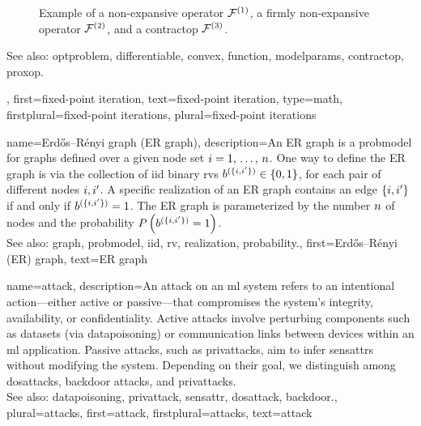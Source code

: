 {{\begin{figure}[H]
\begin{center}
			\end{center} 
			\caption{Example of a non-expansive operator $\mathcal{F}^{(1)}$, a firmly non-expansive operator $\mathcal{F}^{(2)}$, and 
				a \gls{contractop} $\mathcal{F}^{(3)}$. \label{fig_examples_nonexp_dict}}
		\end{figure} 
		See also: \gls{optproblem}, \gls{differentiable}, \gls{convex}, \gls{function}, \glspl{modelparam}, \gls{contractop}, \gls{proxop}.},
	first={fixed-point iteration},
	text={fixed-point iteration},
	type=math, 
	firstplural={fixed-point iterations}, 
	plural={fixed-point iterations}
}


{name={Erd\H{o}s–R\'enyi graph (ER graph)},
	description={An ER \gls{graph} is a \gls{probmodel} for \glspl{graph} defined over 
		a given node set $i=1, \,\ldots, \,n$. One way to define the ER \gls{graph} is 
		via the collection of \gls{iid} binary \glspl{rv} $b^{(\{i,i'\})} \in \{0,1\}$, 
		for each pair of different nodes $i, i'$. A specific \gls{realization}  
		of an ER \gls{graph} contains an edge $\{i,i'\}$ if and only if 
		$b^{(\{i,i'\})}=1$. The ER \gls{graph} is parameterized by the 
		number $n$ of nodes and the \gls{probability} $P\left(b^{(\{i,i'\})}=1\right)$. 
		\\
		See also: \gls{graph}, \gls{probmodel}, \gls{iid}, \gls{rv}, \gls{realization}, \gls{probability}.},
	first={Erd\H{o}s–R\'enyi (ER) graph},
	text={ER graph}
}

{name={attack},  
	description={An attack on an \gls{ml} system refers to an intentional action—either 
		active or passive—that compromises the system's integrity, availability, or confidentiality. 
		Active attacks involve perturbing components such as \glspl{dataset} (via \gls{datapoisoning}) 
		or communication links between \glspl{device} within an \gls{ml} application. Passive attacks, 
		such as \glspl{privattack}, aim to infer \glspl{sensattr} without modifying the system. 
		Depending on their goal, we distinguish among \glspl{dosattack}, \gls{backdoor} attacks, and \glspl{privattack}.
		\\
		See also: \gls{datapoisoning}, \gls{privattack}, \gls{sensattr}, \gls{dosattack}, \gls{backdoor}.},
	plural={attacks}, 
	first={attack},
	firstplural={attacks},
	text={attack}
}

